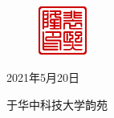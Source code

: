 \documentclass[supercite]{HustGraduPaper}
\begin{document}
\begin{thankpage}
	



	
	\begin{figure}[htb]
		\raggedleft
		\includegraphics[width=16mm]{Figures/Seal-pxl.pdf}
	\end{figure}

	\begin{flushright}
		2021年5月20日

		于华中科技大学韵苑
	\end{flushright}
	
\end{thankpage}


\end{document}
